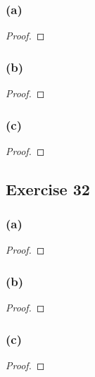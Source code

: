 \documentclass[14pt]{extarticle}
\begin{document}
\subsubsection{(a)}

\begin{proof}

\end{proof}

\subsubsection{(b)}

\begin{proof}

\end{proof}

\subsubsection{(c)}

\begin{proof}

\end{proof}

\subsection{Exercise 32}

\subsubsection{(a)}

\begin{proof}

\end{proof}

\subsubsection{(b)}

\begin{proof}

\end{proof}

\subsubsection{(c)}

\begin{proof}

\end{proof}
\end{document}
